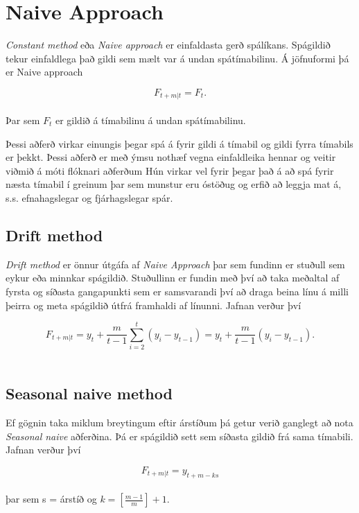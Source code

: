\section{Naive Approach}
\textit{Constant method} eða \textit{Naive approach} er einfaldasta gerð spálíkans. Spágildið tekur einfaldlega það gildi sem mælt var á undan spátímabilinu. Á jöfnuformi þá er Naive approach

$$F_{t+m|t} = F_t.$$\\

Þar sem $F_t$ er gildið á tímabilinu á undan spátímabilinu.

Þessi aðferð virkar einungis þegar spá á fyrir gildi á tímabil og gildi fyrra tímabils er þekkt.
Þessi aðferð er með ýmsu nothæf vegna einfaldleika hennar og veitir viðmið á móti flóknari aðferðum Hún virkar vel fyrir þegar það á að spá fyrir næsta tímabil í greinum þar sem munstur eru óstöðug og erfið að leggja mat á, s.s. efnahagslegar og fjárhagslegar spár\cite{NaiveApproach}.

\subsection {Drift method}

\textit{Drift method} \cite{NaiveApproach2} er önnur útgáfa af \textit{Naive Approach} þar sem fundinn er stuðull sem eykur eða minnkar spágildið. Stuðullinn er fundin með því að taka meðaltal af fyrsta og síðasta gangapunkti sem er samsvarandi því að draga beina línu á milli þeirra og meta spágildið útfrá framhaldi af línunni. Jafnan verður því

$$F_{t+m|t} = y_t + \frac{m}{t-1}\displaystyle\sum_{i=2}^{t} (y_i-y_{t-1}) = y_t + \frac{m}{t-1}(y_i-y_{t-1}) .$$\\

\subsection{Seasonal naive method}
Ef gögnin taka miklum breytingum eftir árstíðum þá getur verið ganglegt að nota \textit{Seasonal naive} aðferðina. Þá er spágildið sett sem síðasta gildið frá sama tímabili. Jafnan verður því

$$ F_{t+m|t} = y_{t+m-ks} $$\\

þar sem s = árstíð og $k = [\frac{m-1}{m}]+1$.
